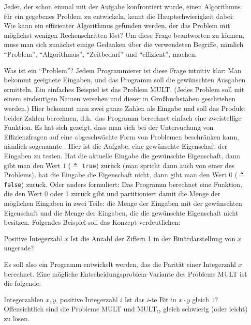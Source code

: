 Jeder, der schon einmal mit der Aufgabe konfrontiert wurde, einen
Algorithmus für ein gegebenes Problem zu entwickeln, kennt die
Hauptschwierigkeit dabei: Wie kann ein effizienter Algorithmus
gefunden werden, der das Problem mit möglichst wenigen Rechenschritten
löst? Um diese Frage beantworten zu können, muss man sich zunächst
einige Gedanken über die verwendeten Begriffe, nämlich "`Problem"',
"`Algorithmus"', "`Zeitbedarf"' und "`effizient"', machen.

Was ist ein "`Problem"'? Jedem Programmierer ist diese Frage intuitiv
klar: Man bekommt geeignete Eingaben, und das Programm soll die
gewünschten Ausgaben ermitteln. Ein einfaches Beispiel ist das Problem
MULT. (Jedes Problem soll mit einem eindeutigen Namen versehen und
dieser in Großbuchstaben geschrieben werden.) Hier bekommt man zwei
ganze Zahlen als Eingabe und soll das Produkt beider Zahlen berechnen,
d.h.~das Programm berechnet einfach eine zweistellige Funktion. Es hat
sich gezeigt, dass man sich bei der Untersuchung von Effizienzfragen
auf eine abgeschwächte Form von Problemen beschränken kann, nämlich
sogenannte . Hier ist die Aufgabe, eine
gewünschte Eigenschaft der Eingaben zu testen. Hat die aktuelle
Eingabe die gewünschte Eigenschaft, dann gibt man den Wert $1$
($\triangleq$ \texttt{true}) zurück
(man spricht dann auch von einer 
 des Problems), hat 
die Eingabe die Eigenschaft nicht, dann gibt man den Wert $0$
($\triangleq$ \texttt{false}) zurück. Oder anders formuliert: Das
Programm berechnet eine Funktion, die den Wert 0 oder 1 zurück gibt
und partitioniert damit die Menge der möglichen Eingaben in zwei
Teile: die Menge der Eingaben mit der gewünschten Eigenschaft und die
Menge der Eingaben, die die gewünschte Eigenschaft nicht
besitzen. Folgendes Beispiel soll das Konzept verdeutlichen:

{Positive Integerzahl $x$}
{Ist die Anzahl der Ziffern 1 in der Binärdarstellung von $x$ ungerade?}

Es soll also ein Programm entwickelt werden, das die Parität einer
Integerzahl $x$ berechnet. Eine mögliche Entscheidungsproblem-Variante
des Problems MULT ist die folgende:

\goodbreak
{}
{Integerzahlen $x,y$, positive Integerzahl $i$}
{Ist das $i$-te Bit in $x\cdot y$ gleich $1$?}
Offensichtlich sind die Probleme MULT und MULT$_\mathrm{D}$ gleich schwierig (oder
leicht) zu lösen.

